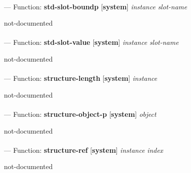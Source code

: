 \paragraph{}
\label{SYSTEM:STD-SLOT-BOUNDP}
--- Function: \textbf{std-slot-boundp} [\textbf{system}] \textit{instance slot-name}

\begin{adjustwidth}{5em}{5em}
not-documented
\end{adjustwidth}

\paragraph{}
\label{SYSTEM:STD-SLOT-VALUE}
--- Function: \textbf{std-slot-value} [\textbf{system}] \textit{instance slot-name}

\begin{adjustwidth}{5em}{5em}
not-documented
\end{adjustwidth}

\paragraph{}
\label{SYSTEM:STRUCTURE-LENGTH}
--- Function: \textbf{structure-length} [\textbf{system}] \textit{instance}

\begin{adjustwidth}{5em}{5em}
not-documented
\end{adjustwidth}

\paragraph{}
\label{SYSTEM:STRUCTURE-OBJECT-P}
--- Function: \textbf{structure-object-p} [\textbf{system}] \textit{object}

\begin{adjustwidth}{5em}{5em}
not-documented
\end{adjustwidth}

\paragraph{}
\label{SYSTEM:STRUCTURE-REF}
--- Function: \textbf{structure-ref} [\textbf{system}] \textit{instance index}

\begin{adjustwidth}{5em}{5em}
not-documented
\end{adjustwidth}

